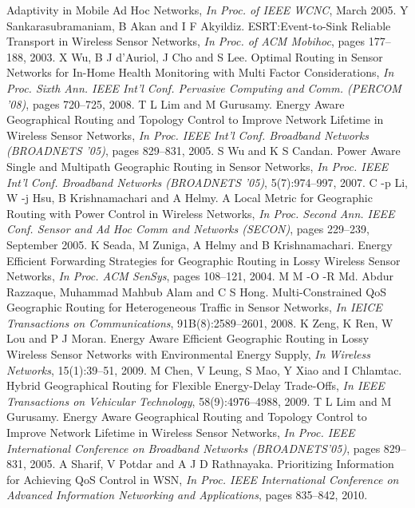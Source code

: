 \documentclass[fleqn,twoside]{article}
\begin{document}
\begin{thebibliography}{36}
{  Adaptivity in Mobile Ad Hoc Networks}, \emph{In Proc. of IEEE WCNC}, March 2005.
Y Sankarasubramaniam, B Akan and I F Akyildiz. {ESRT:Event-to-Sink
  Reliable Transport in Wireless Sensor Networks}, \emph{In Proc. of ACM
  Mobihoc}, pages 177--188, 2003.
X Wu, B J d’Auriol, J Cho and S Lee. {Optimal Routing in Sensor
  Networks for In-Home Health Monitoring with Multi Factor Considerations},
  \emph{In Proc. Sixth Ann. IEEE Int’l Conf. Pervasive Computing and Comm.
  (PERCOM ’08)}, pages 720--725, 2008.
T L Lim and M Gurusamy. {Energy Aware Geographical Routing and Topology
  Control to Improve Network Lifetime in Wireless Sensor Networks},
  \emph{In Proc. IEEE Int’l Conf. Broadband Networks (BROADNETS ’05)}, pages 829--831, 2005.
S Wu and K S Candan. {Power Aware Single and Multipath Geographic Routing
  in Sensor Networks}, \emph{In Proc. IEEE Int’l Conf. Broadband Networks
  (BROADNETS ’05)}, 5(7):974--997, 2007.
C -p Li, W -j Hsu, B Krishnamachari and A Helmy. {A Local Metric for
  Geographic Routing with Power Control in Wireless Networks}, \emph{In Proc.
  Second Ann. IEEE Conf. Sensor and Ad Hoc Comm and Networks (SECON)}, pages
  229--239, September 2005.
K Seada, M Zuniga, A Helmy and B Krishnamachari. {Energy Efficient
  Forwarding Strategies for Geographic Routing in Lossy Wireless Sensor
  Networks}, \emph{In Proc. ACM SenSys}, pages 108--121, 2004.
M M -O -R Md. Abdur Razzaque, Muhammad Mahbub Alam and C S Hong.
  {Multi-Constrained QoS Geographic Routing for Heterogeneous Traffic in
  Sensor Networks}, \emph{In IEICE Transactions on Communications}, 91B(8):2589--2601, 2008.
K Zeng, K Ren, W Lou and P J Moran. {Energy Aware Efficient
  Geographic Routing in Lossy Wireless Sensor Networks with Environmental
  Energy Supply}, \emph{In Wireless Networks}, 15(1):39--51, 2009.
M Chen, V Leung, S Mao, Y Xiao and I Chlamtac. {Hybrid Geographical
  Routing for Flexible Energy-Delay Trade-Offs}, \emph{In IEEE Transactions
  on Vehicular Technology}, 58(9):4976--4988, 2009.
T L Lim and M Gurusamy. {Energy Aware Geographical Routing and Topology
  Control to Improve Network Lifetime in Wireless Sensor Networks},
  \emph{In Proc. IEEE International Conference on Broadband Networks
  (BROADNETS’05)}, pages 829--831, 2005.
A Sharif, V Potdar and A J D Rathnayaka. {Prioritizing Information for
  Achieving QoS Control in WSN}, \emph{In Proc. IEEE International Conference
  on Advanced Information Networking and Applications}, pages 835--842, 2010.

\end{thebibliography}
\end{document}
